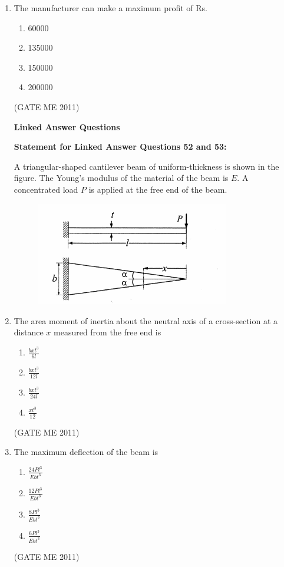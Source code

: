 \documentclass[journal]{IEEEtran}
\begin{document}
\begin{enumerate}
\item The manufacturer can make a maximum profit of Rs.
\begin{multicols}{4}
\begin{enumerate}
\item 60000
\item 135000
\item 150000
\item 200000
\end{enumerate}
\end{multicols}    
\hfill (GATE ME 2011)

\textbf{Linked Answer Questions}

\textbf{Statement for Linked Answer Questions 52 and 53:}

 A triangular-shaped cantilever beam of uniform-thickness is shown in the figure. The Young's modulus of the material of the beam is $ E $. A concentrated load $ P $ is applied at the free end of the beam.

 \begin{figure}[H]
    \centering
    \includegraphics[width=0.8\textwidth]{Fig 11.png}
    \caption{}
    \label{fig:question52,53}
\end{figure}

\item The area moment of inertia about the neutral axis of a cross-section at a distance $ x $ measured from the free end is
\begin{multicols}{4}
\begin{enumerate}
\item $ \frac{bxt^3}{6l} $
\item $ \frac{bxt^3}{12l} $
\item $ \frac{bxt^3}{24l} $
\item $ \frac{xt^3}{12} $
\end{enumerate}
\end{multicols}   
\hfill (GATE ME 2011)

\item The maximum deflection of the beam is
\begin{multicols}{4}
\begin{enumerate}
\item $ \frac{24Pl^3}{Ebt^3} $
\item $ \frac{12Pl^3}{Ebt^3} $
\item $ \frac{8Pl^3}{Ebt^3} $
\item $ \frac{6Pl^3}{Ebt^3} $
\end{enumerate}
\end{multicols}   
\hfill (GATE ME 2011)


\end{enumerate}
\end{document}
